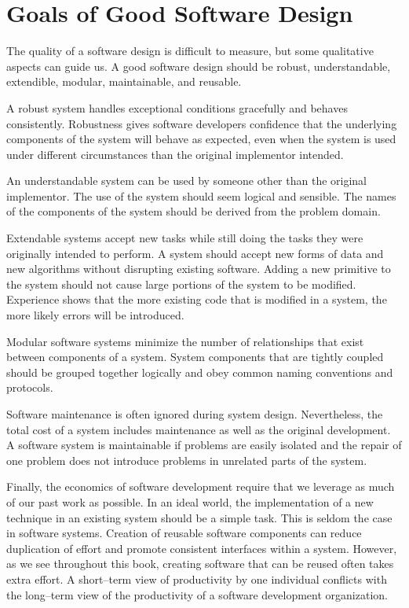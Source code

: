 \section{Goals of Good Software Design}

The quality of a software design is difficult to measure, but some qualitative aspects can guide us. A good software design should be robust, understandable, extendible, modular, maintainable, and reusable.

A robust system handles exceptional conditions gracefully and behaves consistently. Robustness gives software developers confidence that the underlying components of the system will behave as expected, even when the system is used under different circumstances than the original implementor intended.

An understandable system can be used by someone other than the original implementor. The use of the system should seem logical and sensible. The names of the components of the system should be derived from the problem domain.

Extendable systems accept new tasks while still doing the tasks they were originally intended to perform. A system should accept new forms of data and new algorithms without disrupting existing software. Adding a new primitive to the system should not cause large portions of the system to be modified. Experience shows that the more existing code that is modified in a system, the more likely errors will be introduced.

Modular software systems minimize the number of relationships that exist between components of a system. System components that are tightly coupled should be grouped together logically and obey common naming conventions and protocols.

Software maintenance is often ignored during system design. Nevertheless, the total cost of a system includes maintenance as well as the original development. A software system is maintainable if problems are easily isolated and the repair of one problem does not introduce problems in unrelated parts of the system.

Finally, the economics of software development require that we leverage as much of our past work as possible. In an ideal world, the implementation of a new technique in an existing system should be a simple task. This is seldom the case in software systems. Creation of reusable software components can reduce duplication of effort and promote consistent interfaces within a system. However, as we see throughout this book, creating software that can be reused often takes extra effort. A short--term view of productivity by one individual conflicts with the long--term view of the productivity of a software development organization.

